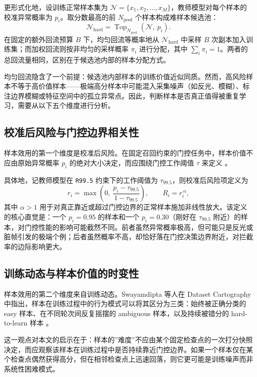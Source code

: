 \documentclass[UTF8,openany,12pt]{ctexbook}
\newcommand{\formalmetric}[1]{\texttt{#1}}
\begin{document}
更形式化地，设训练正常样本集为 $\mathcal{N} = \{x_1, x_2, \dots, x_M\}$，教师模型对每个样本的校准异常概率为 $p_i$。取分数最高的前 $N_{\mathrm{pool}}$ 个样本构成难样本候选池：
\begin{equation}
\mathcal{N}_{\mathrm{hard}} = \operatorname{Top}_{N_{\mathrm{pool}}}(\mathcal{N},\ p_i).
\end{equation}
在固定的额外回流预算 $B$ 下，均匀回流等概率地从 $\mathcal{N}_{\mathrm{hard}}$ 中采样 $B$ 次副本加入训练集；而加权回流则按非均匀的采样概率 $\pi_i$ 进行分配，其中 $\sum_{i} \pi_i = 1$。两者的总回流量相同，区别在于候选池内部的样本分配方式。

均匀回流隐含了一个前提：候选池内部样本的训练价值近似同质。然而，高风险样本不等于高价值样本——极端高分样本中可能混入采集噪声（如反光、模糊）、标注边界模糊或特征空间中的孤立异常点。因此，判断样本是否真正值得被重复学习，需要从以下五个维度进行分析。

\subsection{校准后风险与门控边界相关性}
样本效用的第一个维度是校准后风险。在固定召回约束的门控任务中，样本价值不应由原始异常概率 $p_i$ 的绝对大小决定，而应围绕门控工作阈值 $\tau$ 来定义 \cite{guo2017calibration,kumar2021constrained}。

具体地，记教师模型在 \formalmetric{R99.5} 约束下的工作阈值为 $\tau_{99.5}$，则校准后风险项定义为
\begin{equation}
r_i = \max\!\left(0,\ \frac{p_i - \tau_{99.5}}{1 - \tau_{99.5}}\right),
\qquad
R_i = r_i^{\,\alpha},
\end{equation}
其中 $\alpha > 1$ 用于对真正靠近或超过门控边界的正常样本施加非线性放大。该定义的核心直觉是：一个 $p_i = 0.95$ 的样本和一个 $p_i = 0.30$（刚好在 $\tau_{99.5}$ 附近）的样本，对门控性能的影响可能截然不同。前者虽然异常概率极高，但可能只是反光或脏帧引发的极端个例；后者虽然概率不高，却恰好落在门控决策边界附近，对拦截率的边际影响更大。

\subsection{训练动态与样本价值的时变性}
样本效用的第二个维度来自训练动态。Swayamdipta 等人在 Dataset Cartography 中指出，样本在训练过程中的行为模式可以将其区分为三类：始终被正确分类的 easy 样本、在不同轮次间反复摇摆的 ambiguous 样本，以及持续被错分的 hard-to-learn 样本 \cite{swayamdipta2020cartography}。

这一观点对本文的启示在于：样本的”难度”不应由某个固定检查点的一次打分快照决定，而应观察该样本在训练过程中是否持续靠近门控边界。如果一个样本仅在某个检查点偶然获得高分，但在相邻检查点上迅速回落，则它更可能是训练噪声而非系统性困难模式。
\end{document}
